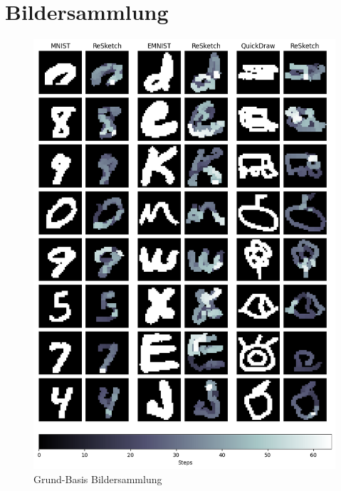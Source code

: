 \section{Bildersammlung}\label{chap:r_bild}
\begin{figure}[!ht]
    \centering
    \includegraphics[width=\textwidth]{images/resultate/base-base.png}
    \caption{Grund-Basis Bildersammlung}\label{fig:Grund-Basis}
\end{figure}

